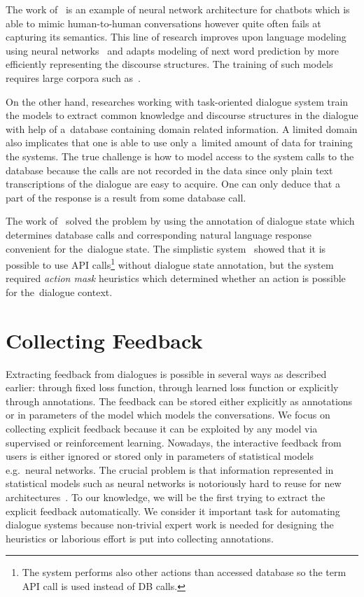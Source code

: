 \documentclass[11pt]{article}
\begin{document}
The work of~\cite{serban_multiresolution_2016} is an example of neural network architecture for chatbots which is able to mimic human-to-human conversations however quite often fails at capturing its semantics.
This line of research improves upon language modeling using neural networks~\cite{mikolov_efficient_2013} and adapts modeling of next word prediction by more efficiently representing the discourse structures.
The training of such models requires large corpora such as~\cite{lowe_ubuntu_2015}. 

On the other hand, researches working with task-oriented dialogue system train the models to extract common knowledge and discourse structures in the dialogue with help of a~database containing domain related information.
A limited domain also implicates that one is able to use only a~limited amount of data for training the systems.
The true challenge is how to model access to the system calls to the database because the calls are not recorded in the data since only plain text transcriptions of the dialogue are easy to acquire.
One can only deduce that a part of the response is a result from some database call.

The work of~\cite{wen_networkbased_2016} solved the problem by using the annotation of dialogue state which determines database calls and corresponding natural language response convenient for the~dialogue state. 
The simplistic system~\cite{williams2016end} showed that it is possible to use API calls\footnote{The system performs also other actions than accessed database so the term API call is used instead of DB calls.} without dialogue state annotation, but the system required {\it action mask} heuristics which determined whether an action is possible for the~dialogue context.

\section{Collecting Feedback}
\label{sec:learn_feedback}
Extracting feedback from dialogues is possible in several ways as described earlier: through fixed loss function, through learned loss function or explicitly through annotations.
The feedback can be stored either explicitly as annotations or in parameters of the model which models the conversations.
We focus on collecting explicit feedback because it can be exploited by any model via supervised or reinforcement learning.
Nowadays, the interactive feedback from users is either ignored or stored only in parameters of statistical models e.g.\ neural networks.
The crucial problem is that information represented in statistical models such as neural networks is notoriously hard to reuse for new architectures~\cite{oquab_learning_2014}.
To our knowledge, we will be the first trying to extract the explicit feedback automatically.
We consider it important task for automating dialogue systems because non-trivial expert work is needed for designing the heuristics or laborious effort is put into collecting annotations.
\end{document}
